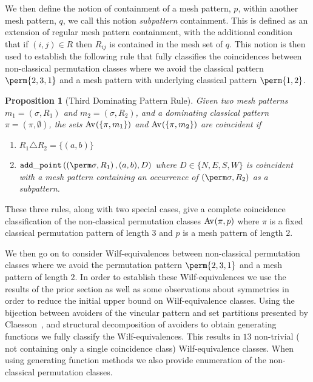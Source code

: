 \documentclass[11pt,a4paper]{article}
\newtheorem{proposition}[theorem]{Proposition}
\theoremstyle{definition}
\begin{document}
We then define the notion of containment of a mesh pattern, \(p\), within
another mesh pattern, \(q\), we call this notion \emph{subpattern} containment.
This is defined as an extension of regular mesh pattern containment, with the
additional condition that if \((i,j)\in R\text{ then } R_{ij}\) is contained in
the mesh set of \(q\). This notion is then used to establish the following rule
that fully classifies the coincidences between non-classical permutation classes
where we avoid the classical pattern \(\perm{2,3,1}\) and a mesh pattern with
underlying classical pattern \(\perm{1,2}\).
\begin{proposition}[Third Dominating Pattern Rule]
    \label{prop:dom3}
    Given two mesh patterns \(m_1 =(\sigma, R_1)\) and \(m_2 = (\sigma, R_2)\),
    and a dominating classical pattern \(\pi = (\pi,\emptyset)\), the sets
    \(\operatorname{Av}_{}\!\left(\{\pi,m_1\}\right)\) and \(\operatorname{Av}_{}\!\left(\{\pi,m_2\}\right)\) are coincident if
    \begin{enumerate}
        \item \(R_1 \triangle R_2 = \{(a,b)\}\)
        \item\label{prop:dom3:condocc} \(\addp[D]{\mperm{\sigma}{R_1}}{(a,b)}\)
            where \(D\in\{N,E,S,W\}\)
            is coincident with a mesh pattern containing an occurrence of
            \(\mperm{\sigma}{R_2}\) as a subpattern.
    \end{enumerate}
\end{proposition}

These three rules, along with two special cases, give a complete coincidence
classification of the non-classical permutation classes \(\operatorname{Av}_{}\!\left(\pi,p\right)\) where
\(\pi\) is a fixed classical permutation pattern of length \(3\) and \(p\) is a
mesh pattern of length \(2\).

We then go on to consider Wilf-equivalences between non-classical permutation
classes where we avoid the permutation pattern \(\perm{2,3,1}\) and
a mesh pattern of length \(2\). In order to establish these Wilf-equivalences
we use the results of the prior section as well as some observations about
symmetries in order to reduce the initial upper bound on Wilf-equivalence classes.
Using the bijection between avoiders of the vincular pattern
 and set partitions presented by
Claesson~\cite{A}, and structural decomposition of avoiders to obtain generating
functions we fully classify the Wilf-equivalences. This results in \(13\)
non-trivial (\ie{} not containing only a single coincidence class) Wilf-equivalence
classes. When using generating function methods we also provide enumeration of
the non-classical permutation classes.
\end{document}
